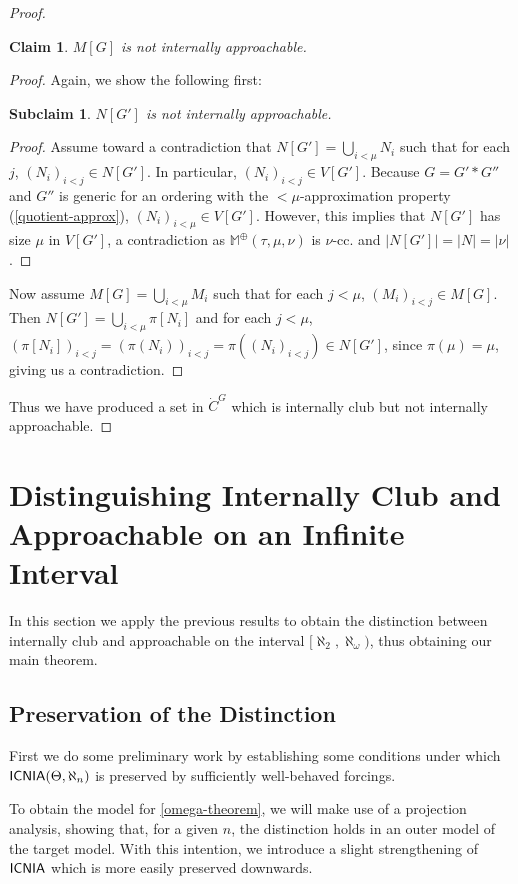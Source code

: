 \documentclass[a4paper]{amsart}
\theoremstyle{definition}
\theoremstyle{remark}
\theoremstyle{plain}
\newtheorem{myclan}[mydef]{Claim}
\newtheorem{mysclai}[mydef]{Subclaim}
\numberwithin{mydef}{section}
\DeclareMathOperator{\ICNIA}{\textup{\textsf{ICNIA}}}
\newcommand{\dM}{\mathbb{M}}
\begin{document}
\begin{proof}
		\begin{myclan}
			$M[G]$ is not internally approachable.
		\end{myclan}
		\begin{proof}
			Again, we show the following first:
			\begin{mysclai}
				$N[G']$ is not internally approachable.
			\end{mysclai}
			\begin{proof}
				Assume toward a contradiction that $N[G']=\bigcup_{i<\mu}N_i$ such that for each $j$, $(N_i)_{i<j}\in N[G']$. In particular, $(N_i)_{i<j}\in V[G']$. Because $G=G'*G''$ and $G''$ is generic for an ordering with the $<\mu$-approximation property (\autoref{quotient-approx}), $(N_i)_{i<\mu}\in V[G']$. However, this implies that $N[G']$ has size $\mu$ in $V[G']$, a contradiction as $\dM^\oplus(\tau,\mu,\nu)$ is $\nu$-cc. and $|N[G']|=|N|=|\nu|$.
			\end{proof}
			Now assume $M[G]=\bigcup_{i<\mu}M_i$ such that for each $j<\mu$, $(M_i)_{i<j}\in M[G]$. Then $N[G']=\bigcup_{i<\mu}\pi[N_i]$ and for each $j<\mu$, $(\pi[N_i])_{i<j}=(\pi(N_i))_{i<j}=\pi((N_i)_{i<j})\in N[G']$, since $\pi(\mu)=\mu$, giving us a contradiction.
		\end{proof}
		Thus we have produced a set in $\dot{C}^G$ which is internally club but not internally approachable.
	\end{proof}
	
	\section{Distinguishing Internally Club and Approachable on an Infinite Interval}
	
	In this section we apply the previous results to obtain the distinction between internally club and approachable on the interval $[\aleph_2,\aleph_{\omega})$, thus obtaining our main theorem.
	
	\subsection{Preservation of the Distinction}
	
	First we do some preliminary work by establishing some conditions under which $\ICNIA(\Theta,\aleph_n)$ is preserved by sufficiently well-behaved forcings.
	
	
	To obtain the model for \autoref{omega-theorem}, we will make use of a projection analysis, showing that, for a given $n$, the distinction holds in an outer model of the target model. With this intention, we introduce a slight strengthening of $\ICNIA$ which is more easily preserved downwards.
	
\end{document}
